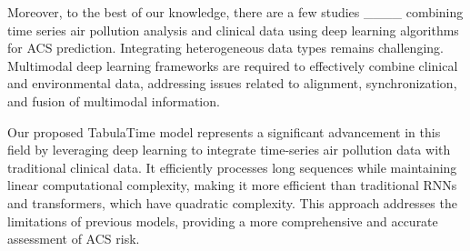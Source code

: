 Moreover, to the best of our knowledge, there are a few studies ____ combining time series air pollution analysis and clinical data using deep learning algorithms for ACS prediction. Integrating heterogeneous data types remains challenging.  Multimodal deep learning frameworks are required to effectively combine clinical and environmental data, addressing issues related to alignment, synchronization, and fusion of multimodal information.  

Our proposed TabulaTime model represents a significant advancement in this field by leveraging deep learning to integrate time-series air pollution data with traditional clinical data. It efficiently processes long sequences while maintaining linear computational complexity, making it more efficient than traditional RNNs and transformers, which have quadratic complexity. This approach addresses the limitations of previous models, providing a more comprehensive and accurate assessment of ACS risk.